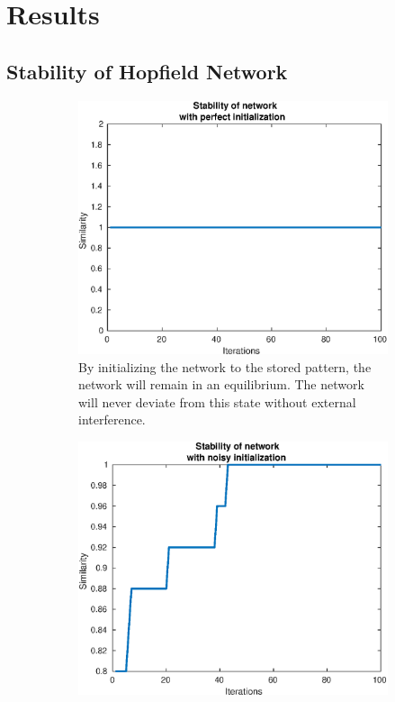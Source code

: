 \section{Results}

\subsection{Stability of Hopfield Network}
\begin{figure}[H]
    \centering
    \begin{subfigure}{0.49\textwidth}
        \includegraphics[width=\textwidth]{figs/stable}
        \caption{By initializing the network to the stored pattern, the network will remain in an equilibrium. The network will never deviate from this state without external interference.}
    \end{subfigure}
    \begin{subfigure}{0.49\textwidth}
        \includegraphics[width=\textwidth]{figs/stable-with-noise}

\end{subfigure}
\end{figure}
